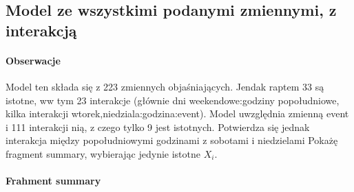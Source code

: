 \documentclass[a4paper,11pt]{article}
\begin{document}
\subsection{Model ze wszystkimi podanymi zmiennymi, z interakcją}

\paragraph{Obserwacje}

Model ten składa się z 223 zmiennych objaśniających. Jendak raptem 33 są istotne, ww tym 23 interakcje (głównie dni weekendowe:godziny popołudniowe, kilka interakcji wtorek,niedziala:godzina:event). Model uwzględnia zmienną event i 111 interakcji nią, z czego tylko 9 jest istotnych. Potwierdza się jednak interakcja między popołudniowymi godzinami z sobotami i niedzielami Pokażę fragment summary, wybierając jedynie istotne $X_{i}$.  

\paragraph{Frahment summary}
\end{document}
